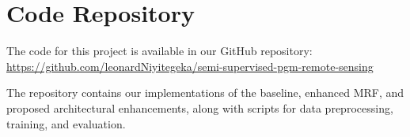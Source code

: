 \documentclass[conference]{IEEEtran}
\begin{document}
\section*{Code Repository}

The code for this project is available in our GitHub repository:
\url{https://github.com/leonardNiyitegeka/semi-supervised-pgm-remote-sensing}

The repository contains our implementations of the baseline, enhanced MRF, and proposed architectural enhancements, along with scripts for data preprocessing, training, and evaluation.



\end{document}
